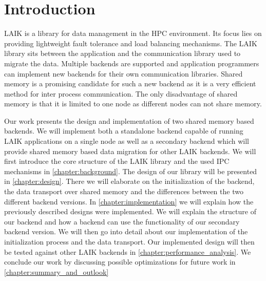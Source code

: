
\chapter{Introduction}\label{chapter:introduction}

LAIK is a library for data management in the HPC environment.
Its focus lies on providing lightweight fault tolerance and load balancing mechanisms.
The LAIK library sits between the application and the communication library used to migrate the data.
Multiple backends are supported and application programmers can implement new backends for their own communication libraries.
Shared memory is a promising candidate for such a new backend as it is a very efficient method for inter process communication.
The only disadvantage of shared memory is that it is limited to one node as different nodes can not share memory.

Our work presents the design and implementation of two shared memory based backends.
We will implement both a standalone backend capable of running LAIK applications on a single node as well as a secondary backend which will provide shared memory based data migration for other LAIK backends.
We will first introduce the core structure of the LAIK library and the used IPC mechanisms in \autoref{chapter:background}.
The design of our library will be presented in \autoref{chapter:design}.
There we will elaborate on the initialization of the backend, the data transport over shared memory and the differences between the two different backend versions.
In \autoref{chapter:implementation} we will explain how the previously described designs were implemented.
We will explain the structure of our backend and how a backend can use the functionality of our secondary backend version.
We will then go into detail about our implementation of the initialization process and the data transport.
Our implemented design will then be tested against other LAIK backends in \autoref{chapter:performance_analysis}.
We conclude our work by discussing possible optimizations for future work in \autoref{chapter:summary_and_outlook}

